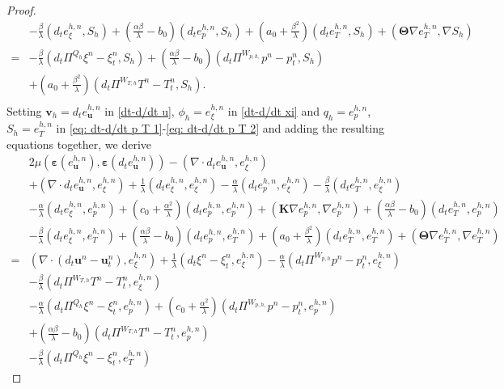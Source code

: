 \documentclass{article}
\numberwithin{equation}{section}
\begin{document}
\begin{proof}
\begin{equation}
\begin{aligned}
& -\frac\beta\lambda(d_te_\xi^{h,n} ,S_h)+(\frac{\alpha\beta}{\lambda}-b_0)(d_te_p^{h,n} ,S_h)
 +(a_0+\frac{\beta^2}{\lambda})(d_te_T^{h,n},S_h)   
  +(\bm\Theta\nabla e_T^{h,n},\nabla S_h) \\
= &-\frac\beta\lambda(d_t\Pi^{Q_h} \xi^n- \xi_t^n,S_h)
+(\frac{\alpha\beta}{\lambda}-b_0)(d_t\Pi^{W_{p,h,}}p^n- p_t^n,S_h)\\
 &+(a_0+\frac{\beta^2}{\lambda})(d_t\Pi^{W_{T,h}}T^n - T_t^n,S_h).   
   \\
\end{aligned}
\end{equation}
 Setting $\bm v_h=d_te_{\bm u}^{h,n}$ in \eqref{dt-d/dt u}, $\phi_h=e_\xi^{h,n}$ in \eqref{dt-d/dt xi} and
  $q_h=e_p^{h,n}$, $S_h=e_T^{h,n}$ in \eqref{eq: dt-d/dt p T 1}-\eqref{eq: dt-d/dt p T 2}
 and adding the resulting equations together, we derive
\begin{equation}    
\begin{aligned}  
& 2\mu(\bm\varepsilon(e_{\bm u}^{h,n} ),\bm\varepsilon(  d_te_{\bm u}^{h,n} ))
   - (\nabla\cdot d_te_{\bm u}^{h,n},e_\xi^{h,n})\\
 &+ (\nabla\cdot d_te_{\bm u}^{h,n}, e_{\xi}^{h,n})+\frac{1}{\lambda}(d_te_\xi^{h,n}, e_{\xi}^{h,n})
   -\frac{\alpha}{\lambda}(d_te_p^{h,n}, e_{\xi}^{h,n})-\frac{\beta}{\lambda}(d_te_T^{h,n}, e_{\xi}^{h,n})\\
 &-\frac\alpha\lambda(d_te_\xi^{h,n} , e_p^{h,n})+(c_0+\frac{\alpha^2}{\lambda})(d_te_p^{h,n} , e_p^{h,n})
 +  (\bm K\nabla e_p^{h,n},\nabla  e_p^{h,n})+ (\frac{\alpha\beta}{\lambda}-b_0)(d_te_T^{h,n} , e_p^{h,n})\\
 & -\frac\beta\lambda(d_te_\xi^{h,n} , e_T^{h,n})+(\frac{\alpha\beta}{\lambda}-b_0)(d_te_p^{h,n} , e_T^{h,n})
 +(a_0+\frac{\beta^2}{\lambda})(d_te_T^{h,n}, e_T^{h,n})   
  +(\bm\Theta\nabla e_T^{h,n},\nabla  e_T^{h,n}) \\
  =& (\nabla\cdot (d_t\bm u^n- \bm u_t^n ),e_{\xi}^{h,n})
    +\frac{1}{\lambda}(d_t\xi^n- \xi_t^n,e_{\xi}^{h,n})
   -\frac{\alpha}{\lambda}( d_t\Pi^{W_{p,h}}p^n- p_t^n,e_{\xi}^{h,n})\\
  & -\frac{\beta}{\lambda}(d_t\Pi^{W_{T,h}}T^n- T_t^n,e_{\xi}^{h,n})\\
  &-\frac\alpha\lambda(d_t\Pi^{Q_h} \xi^n- \xi_t^n ,e_{p}^{h,n})
  +(c_0+\frac{\alpha^2}{\lambda})(d_t\Pi^{W_{p,h,}}p^n- p_t^n ,e_{p}^{h,n}) \\
&+ (\frac{\alpha\beta}{\lambda}-b_0)(d_t\Pi^{W_{T,h}}T^n - T_t^n,e_{p}^{h,n})\\
  &-\frac\beta\lambda(d_t\Pi^{Q_h} \xi^n- \xi_t^n,e_{T}^{h,n})

\end{aligned}
\end{equation}
\end{proof}
\end{document}
